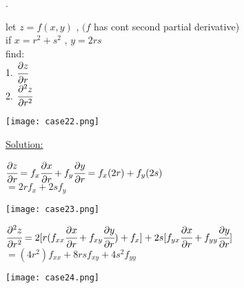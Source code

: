 \noindent{\color{smalt(darkpowderblue)}\rule{\linewidth}{.2mm}}
\begin{example}.\\
\noindent\begin{minipage}{0.5\textwidth}
let $z=f(x,y)$ , $(f$ has cont second partial derivative)\\
if $x=r^2+s^2$ , $y=2rs$\\
find:\\
1. $\cfrac{\partial z}{\partial r}$\\
2. $\cfrac{\partial^2z}{\partial r^2}$\\
\end{minipage}
\noindent\begin{minipage}{0.5\textwidth}
\begin{center}
   \texttt{[image: case22.png]}\\
\end{center}\end{minipage}
{\color{smalt(darkpowderblue)}\underline{Solution:}}\\
\noindent\begin{minipage}{0.5\textwidth}
$\cfrac{\partial z}{\partial r}=f_x\cfrac{\partial x}{\partial r}+f_y\cfrac{\partial y}{\partial r}=f_x(2r)+f_y(2s)$\\
$=2rf_x+2sf_y$\\
\end{minipage}
\noindent\begin{minipage}{0.5\textwidth}
\begin{center}
   \texttt{[image: case23.png]}\\
\end{center}\end{minipage}
\noindent\begin{minipage}{0.5\textwidth}
$\cfrac{\partial^2 z}{\partial r^2}=2[r(f_{xx}\cfrac{\partial x}{\partial r}+f_{x y}\cfrac{\partial y}{\partial r})+f_x]+2s[f_{y x}\cfrac{\partial x}{\partial r}+f_{y y}\cfrac{\partial y}{\partial r}]$\\
$=(4r^2)f_{xx}+8rs f_{x y}+4s^2f_{y y}$\\
\end{minipage}
\noindent\begin{minipage}{0.5\textwidth}
\begin{center}
   \texttt{[image: case24.png]}\\
\end{center}\end{minipage}
\end{example}
